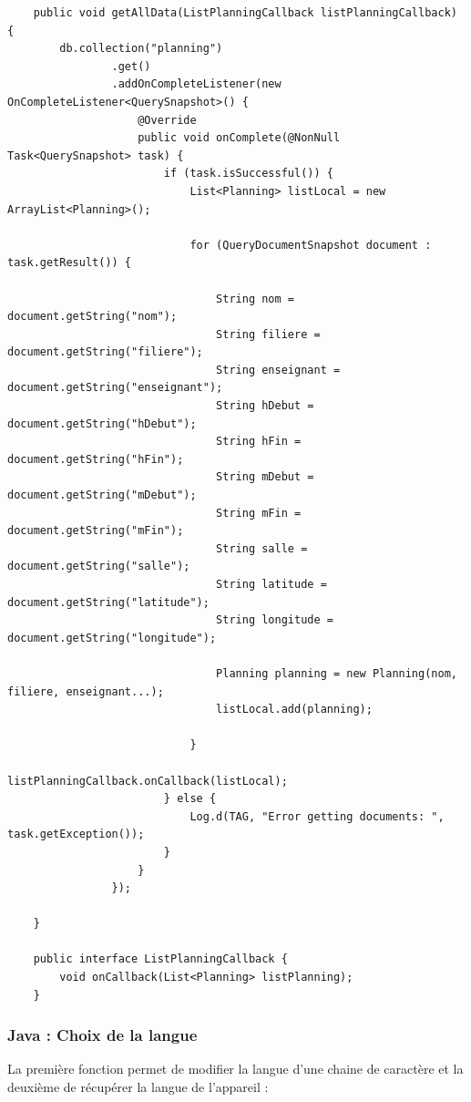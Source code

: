 \documentclass{article}
\begin{document}
\begin{verbatim}
    public void getAllData(ListPlanningCallback listPlanningCallback) {
        db.collection("planning")
                .get()
                .addOnCompleteListener(new OnCompleteListener<QuerySnapshot>() {
                    @Override
                    public void onComplete(@NonNull Task<QuerySnapshot> task) {
                        if (task.isSuccessful()) {
                            List<Planning> listLocal = new ArrayList<Planning>();

                            for (QueryDocumentSnapshot document : task.getResult()) {

                                String nom = document.getString("nom");
                                String filiere = document.getString("filiere");
                                String enseignant = document.getString("enseignant");
                                String hDebut = document.getString("hDebut");
                                String hFin = document.getString("hFin");
                                String mDebut = document.getString("mDebut");
                                String mFin = document.getString("mFin");
                                String salle = document.getString("salle");
                                String latitude = document.getString("latitude");
                                String longitude = document.getString("longitude");

                                Planning planning = new Planning(nom, filiere, enseignant...);
                                listLocal.add(planning);

                            }
                            listPlanningCallback.onCallback(listLocal);
                        } else {
                            Log.d(TAG, "Error getting documents: ", task.getException());
                        }
                    }
                });

    }

    public interface ListPlanningCallback {
        void onCallback(List<Planning> listPlanning);
    }
\end{verbatim}

\subsubsection{Java : Choix de la langue}
La première fonction permet de modifier la langue d'une chaine de caractère et la deuxième de récupérer la langue de l'appareil :
\end{document}
